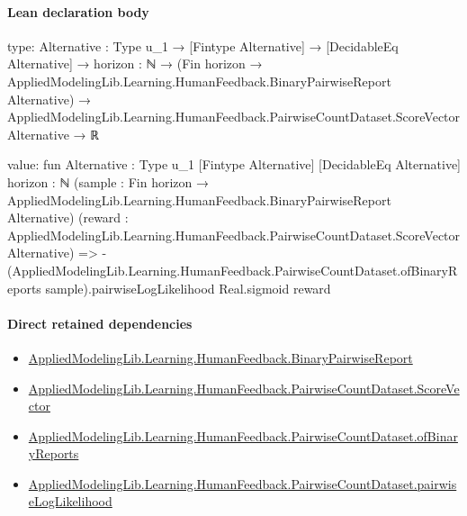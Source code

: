 \documentclass[10pt]{article}
\begin{document}
\paragraph{Lean declaration body}
\begin{ReviewVerbatim}
type:
{Alternative : Type u_1} →
  [Fintype Alternative] →
    [DecidableEq Alternative] →
      {horizon : ℕ} →
        (Fin horizon → AppliedModelingLib.Learning.HumanFeedback.BinaryPairwiseReport Alternative) →
          AppliedModelingLib.Learning.HumanFeedback.PairwiseCountDataset.ScoreVector Alternative → ℝ

value:
fun {Alternative : Type u_1} [Fintype Alternative] [DecidableEq Alternative] {horizon : ℕ}
    (sample : Fin horizon → AppliedModelingLib.Learning.HumanFeedback.BinaryPairwiseReport Alternative)
    (reward : AppliedModelingLib.Learning.HumanFeedback.PairwiseCountDataset.ScoreVector Alternative) =>
  -(AppliedModelingLib.Learning.HumanFeedback.PairwiseCountDataset.ofBinaryReports sample).pairwiseLogLikelihood
      Real.sigmoid reward
\end{ReviewVerbatim}

\paragraph{Direct retained dependencies}
\begin{itemize}\raggedright
\item \hyperlink{governing-declaration-bc3d6ca8e7e0ac9d}{Applied\allowbreak{}Modeling\allowbreak{}Lib.\allowbreak{}Learning.\allowbreak{}Human\allowbreak{}Feedback.\allowbreak{}Binary\allowbreak{}Pairwise\allowbreak{}Report}
\item \hyperlink{governing-declaration-87eda978eb1b0c9d}{Applied\allowbreak{}Modeling\allowbreak{}Lib.\allowbreak{}Learning.\allowbreak{}Human\allowbreak{}Feedback.\allowbreak{}Pairwise\allowbreak{}Count\allowbreak{}Dataset.\allowbreak{}Score\allowbreak{}Vector}
\item \hyperlink{governing-declaration-449f87e91bf37ce0}{Applied\allowbreak{}Modeling\allowbreak{}Lib.\allowbreak{}Learning.\allowbreak{}Human\allowbreak{}Feedback.\allowbreak{}Pairwise\allowbreak{}Count\allowbreak{}Dataset.\allowbreak{}of\allowbreak{}Binary\allowbreak{}Reports}
\item \hyperlink{governing-declaration-10adb9e7c1ff9f4c}{Applied\allowbreak{}Modeling\allowbreak{}Lib.\allowbreak{}Learning.\allowbreak{}Human\allowbreak{}Feedback.\allowbreak{}Pairwise\allowbreak{}Count\allowbreak{}Dataset.\allowbreak{}pairwise\allowbreak{}Log\allowbreak{}Likelihood}
\end{itemize}
\hypertarget{governing-declaration-55b65ae526406849}{}
\end{document}
